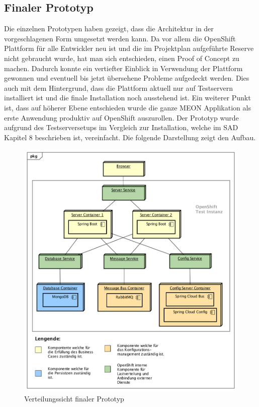 \subsection{Finaler Prototyp}

Die einzelnen Prototypen haben gezeigt, dass die Architektur in der vorgeschlagenen Form umgesetzt werden kann. Da vor allem die OpenShift Plattform für alle Entwickler neu ist und die im Projektplan aufgeführte Reserve nicht gebraucht wurde, hat man sich entschieden, einen Proof of Concept zu machen. Dadurch konnte ein vertiefter Einblick in Verwendung der Plattform gewonnen und eventuell bis jetzt übersehene Probleme aufgedeckt werden. Dies auch mit dem Hintergrund, dass die Plattform aktuell nur auf Testservern installiert ist und die finale Installation noch ausstehend ist. Ein weiterer Punkt ist, dass auf höherer Ebene entschieden wurde die ganze MEON Applikation als erste Anwendung produktiv auf OpenShift auszurollen.\newline\newline
Der Prototyp wurde aufgrund des Testserversetups im Vergleich zur Installation, welche im SAD Kapitel 8 beschrieben ist, vereinfacht. Die folgende Darstellung zeigt den Aufbau.
\begin{figure}[H]
	\centering
	\includegraphics[scale=0.52]{PrototypDeployment.png}
	\caption{Verteilungssicht finaler Prototyp}
\end{figure}
